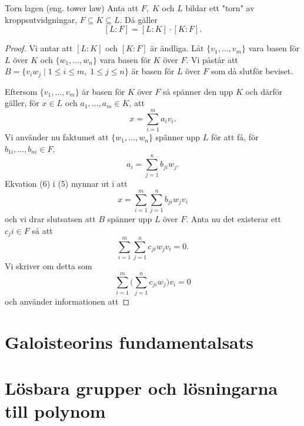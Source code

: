 \documentclass{article}
\theoremstyle{definition}
\begin{document}
\begin{mytheo}{Torn lagen (eng. tower law)}{}
  Anta att $F, \; K$ och $L$ bildar ett "torn" av kroppsutvidgningar, $F \subseteq K \subseteq L$. Då gäller
  \[ [L:F] = [L:K] \cdot [K:F]. \]
\end{mytheo}
\begin{proof}
  Vi antar att $[L:K]$ och $[K:F]$ är ändliga. Låt $\{v_1, \ldots, v_m\}$ vara basen för $L$ över $K$ och $\{w_1, \ldots, w_n\}$ vara basen för $K$ över $F$.
  Vi påstår att $B = \{v_iw_j \; | \; 1 \leq i \leq m, \; 1 \leq j \leq n\}$ är basen för $L$ över $F$ som då slutför beviset.

  Eftersom $\{v_1, \ldots, v_m\}$ är basen för $K$ över $F$ så spänner den upp $K$ och därför gäller, för $x \in L$ och $a_1, \ldots, a_m \in K$, att 
  \begin{equation}
    x = \sum_{i = 1}^m a_i v_i.
  \end{equation}
  Vi använder nu faktumet att $\{w_1, \ldots, w_n\}$ spänner upp $L$ för att få, för 
  \linebreak
  $b_{1i}, \ldots, b_{ni} \in F$,
  \begin{equation}
    a_i = \sum_{j = 1}^n b_{ji}w_j.
  \end{equation}
  Ekvation (6) i (5) mynnar ut i att
  \[x = \sum_{i = 1}^m \sum_{j = 1}^n b_{ji}w_jv_i\]
  och vi drar slutsatsen att $B$ spänner upp $L$ över $F$. Anta nu det existerar ett $c_ji \in F$ så att 
  \[\sum_{i = 1}^m \sum_{j = 1}^n c_{ji}w_jv_i = 0.\]
  Vi skriver om detta som 
  \[\sum_{i = 1}^m \biggl( \sum_{j = 1}^n c_{ji}w_j \biggl) v_i = 0\]
  och använder informationen att 
\end{proof}


\section{Galoisteorins fundamentalsats}
\section{Lösbara grupper och lösningarna till polynom}
\end{document}
